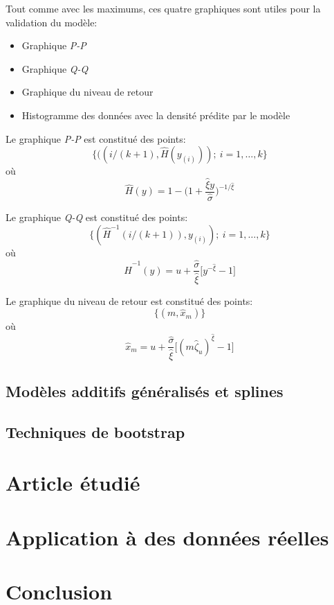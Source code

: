 \documentclass[11pt]{report}
\numberwithin{equation}{section}
\begin{document}
Tout comme avec les maximums, ces quatre graphiques sont utiles pour la validation du modèle:

\begin{itemize}
\item Graphique \textit{P-P}
\item Graphique \textit{Q-Q}
\item Graphique du niveau de retour
\item Histogramme des données avec la densité prédite par le modèle 
\end{itemize}

Le graphique \textit{P-P} est constitué des points:
\begin{equation*}
\{ ((i/(k+1), \hat{H}(y_{(i)}));\ i=1,\dots,k\}
\end{equation*}
où
\begin{equation*}
\hat{H}(y) = 1 - \Bigg(1+\frac{\hat\xi y}{\hat\sigma}\Bigg)^{-1/\hat\xi}
\end{equation*}

Le graphique \textit{Q-Q} est constitué des points:
\begin{equation*}
\{(\hat{H}^{-1}(i/(k+1)), y_{(i)});\ i=1,\dots,k\}
\end{equation*}
où
\begin{equation*}
\hat{H}^{-1}(y) = u + \frac{\hat\sigma}{\hat\xi}\Big[y^{-\hat\xi}-1\Big]
\end{equation*}

Le graphique du niveau de retour est constitué des points:
\begin{equation*}
\{(m, \hat{x}_m)\}
\end{equation*}
où
\begin{equation*}
{\hat{x}_m = u + \frac{\hat\sigma}{\hat\xi} \Big[(m {\hat\zeta}_u)^{\hat\xi} -1\Big]}
\end{equation*}


\section{Modèles additifs généralisés et splines}

\section{Techniques de bootstrap}

\chapter{Article étudié}
\label{chap:article} 


\chapter{Application à des données réelles}
\label{chap:application} 


\chapter*{Conclusion}
\label{chap:conclusion} 




%  
\end{document}
